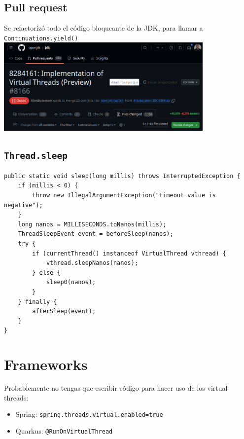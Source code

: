 \documentclass{presentacion}
\begin{document}
\subsection{Pull request}
\begin{frame}
    Se refactorizó todo el código bloqueante de la JDK, para llamar a \texttt{Continuations.yield()}
    \newline
    \newline
    \includegraphics[width=0.8\textwidth]{img/virtual-threads-PR.png}
\end{frame}

\subsection{\texttt{Thread.sleep}}
\begin{frame}
    \begin{verbatim}
public static void sleep(long millis) throws InterruptedException {
    if (millis < 0) {
        throw new IllegalArgumentException("timeout value is negative");
    }
    long nanos = MILLISECONDS.toNanos(millis);
    ThreadSleepEvent event = beforeSleep(nanos);
    try {
        if (currentThread() instanceof VirtualThread vthread) {
            vthread.sleepNanos(nanos);
        } else {
            sleep0(nanos);
        }
    } finally {
        afterSleep(event);
    }
}
    \end{verbatim}
\end{frame}

\section{Frameworks}
\begin{frame}[fragile]
    Probablemente no tengas que escribir código para hacer uso de los virtual threads:
    \vspace{2em}
    \begin{itemize}
     \item Spring: \texttt{spring.threads.virtual.enabled=true}
     \item Quarkus: \texttt{@RunOnVirtualThread}
    \end{itemize}
\end{frame}
\end{document}
